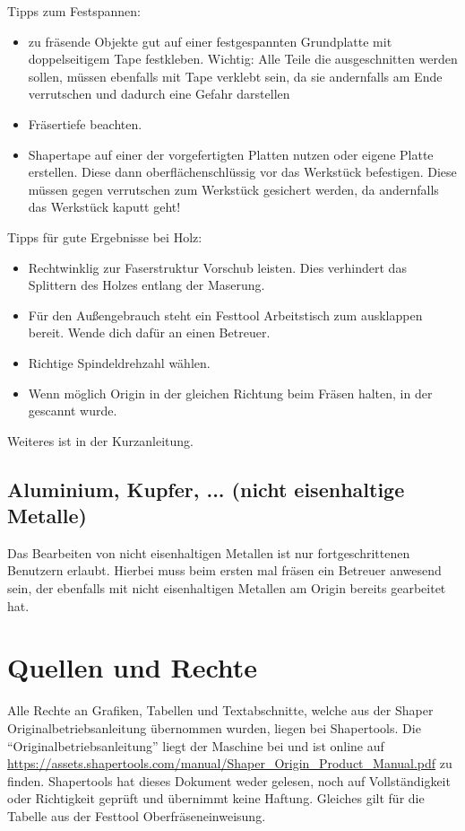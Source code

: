\documentclass{\basedir/fablab-document}
\begin{document}
Tipps zum Festspannen:
\begin{itemize}
    \item zu fräsende Objekte gut auf einer festgespannten Grundplatte mit
        doppelseitigem Tape festkleben. Wichtig: Alle Teile die ausgeschnitten werden
        sollen, müssen ebenfalls mit Tape verklebt sein, da sie andernfalls am
        Ende verrutschen und dadurch eine Gefahr darstellen
    \item Fräsertiefe beachten.
    \item Shapertape auf einer der vorgefertigten Platten nutzen oder eigene
        Platte erstellen. Diese dann oberflächenschlüssig vor das Werkstück
        befestigen. Diese müssen gegen verrutschen zum Werkstück gesichert
        werden, da andernfalls das Werkstück kaputt geht!
\end{itemize}

Tipps für gute Ergebnisse bei Holz:
\begin{itemize}
    \item Rechtwinklig zur Faserstruktur Vorschub leisten. Dies verhindert
        das Splittern des Holzes entlang der Maserung.
    \item Für den Außengebrauch steht ein Festtool Arbeitstisch zum
        ausklappen bereit. Wende dich dafür an einen Betreuer.
    \item Richtige Spindeldrehzahl wählen.
    \item Wenn möglich Origin in der gleichen Richtung beim Fräsen
        halten, in der gescannt wurde.
\end{itemize}

Weiteres ist in der Kurzanleitung.

\subsection{Aluminium, Kupfer, ... (nicht eisenhaltige Metalle)}
Das Bearbeiten von nicht eisenhaltigen Metallen ist nur fortgeschrittenen
Benutzern erlaubt. Hierbei muss beim ersten mal fräsen ein Betreuer anwesend
sein, der ebenfalls mit nicht eisenhaltigen Metallen am Origin bereits gearbeitet hat.

\section{Quellen und Rechte}
\label{quellen}
Alle Rechte an Grafiken, Tabellen und Textabschnitte, welche aus der Shaper
Originalbetriebsanleitung übernommen wurden, liegen bei Shapertools. Die
\enquote{Originalbetriebsanleitung} liegt der Maschine bei und ist online auf
\url{https://assets.shapertools.com/manual/Shaper_Origin_Product_Manual.pdf}
zu finden. Shapertools hat dieses Dokument weder gelesen, noch auf Vollständigkeit
oder Richtigkeit geprüft und übernimmt keine Haftung.
Gleiches gilt für die Tabelle aus der Festtool Oberfräseneinweisung.
\end{document}
